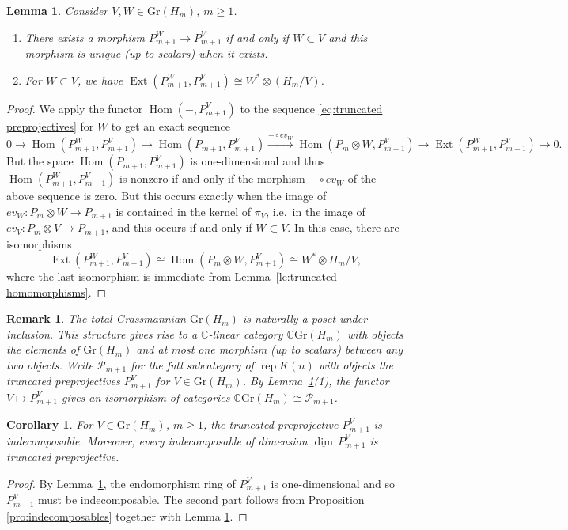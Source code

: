\documentclass{amsart}
\newtheorem{corollary}[theorem]{Corollary}
\newtheorem{lemma}[theorem]{Lemma}
\newtheorem{remark}[theorem]{Remark}
\numberwithin{equation}{section}
\newcommand{\cP}{\mathcal{P}}
\newcommand\udim{{\underline{\dim}\, }}
\newcommand{\rep}{\operatorname{rep}}
\newcommand{\Gr}{\mathrm{Gr}}
\newcommand{\CC}{\mathbb{C}}
\newcommand{\Ext}{\operatorname{Ext}}
\newcommand{\Hom}{\operatorname{Hom}}
\begin{document}
\begin{lemma}
  \label{le:unique morphisms}
  Consider $V,W\in \Gr(H_m)$, $m\ge1$.
  \begin{enumerate}
    \item There exists a morphism $P_{m+1}^W\to P_{m+1}^V$ if and only if $W\subset V$ and this morphism is unique (up to scalars) when it exists.
    \item For $W\subset V$, we have $\Ext(P_{m+1}^W,P_{m+1}^V)\cong W^*\otimes(H_m/V)$.
  \end{enumerate}
\end{lemma}
\begin{proof}
  We apply the functor $\Hom(-,P_{m+1}^V)$ to the sequence \eqref{eq:truncated preprojectives} for $W$ to get an exact sequence
  \[0\longrightarrow \Hom(P_{m+1}^W,P_{m+1}^V)\longrightarrow \Hom(P_{m+1},P_{m+1}^V)\stackrel{-\circ ev_W}{\longrightarrow} \Hom(P_m\otimes W,P_{m+1}^V)\longrightarrow \Ext(P_{m+1}^W,P_{m+1}^V)\longrightarrow 0.\]
  But the space $\Hom(P_{m+1},P_{m+1}^V)$ is one-dimensional and thus $\Hom(P_{m+1}^W,P_{m+1}^V)$ is nonzero if and only if the morphism $-\circ ev_W$ of the above sequence is zero.
  But this occurs exactly when the image of $ev_W:P_m\otimes W\to P_{m+1}$ is contained in the kernel of $\pi_V$, i.e.\ in the image of $ev_V:P_m\otimes V\to P_{m+1}$, and this occurs if and only if $W\subset V$. 
  In this case, there are isomorphisms
  \[\Ext(P_{m+1}^W,P_{m+1}^V)\cong\Hom(P_m\otimes W,P_{m+1}^V)\cong W^*\otimes H_m/V,\]
  where the last isomorphism is immediate from Lemma~\ref{le:truncated homomorphisms}.
\end{proof}

\begin{remark}
  The total Grassmannian $\Gr(H_m)$ is naturally a poset under inclusion.
  This structure gives rise to a $\CC$-linear category $\CC \Gr(H_m)$ with objects the elements of $\Gr(H_m)$ and at most one morphism (up to scalars) between any two objects.
  Write $\cP_{m+1}$ for the full subcategory of $\rep K(n)$ with objects the truncated preprojectives $P_{m+1}^V$ for $V\in \Gr(H_m)$.
  By Lemma~\ref{le:unique morphisms}(1), the functor $V\mapsto P_{m+1}^V$ gives an isomorphism of categories $\CC \Gr(H_m)\cong\cP_{m+1}$.
\end{remark}

\begin{corollary}
  \label{cor:indecomposable truncated} 
  For $V\in \Gr(H_m)$, $m\ge1$, the truncated preprojective $P_{m+1}^V$ is indecomposable.
  Moreover, every indecomposable of dimension $\udim P_{m+1}^V$ is truncated preprojective.
\end{corollary}
\begin{proof}
  By Lemma~\ref{le:unique morphisms}, the endomorphism ring of $P_{m+1}^V$ is one-dimensional and so $P_{m+1}^V$ must be indecomposable.
  The second part follows from Proposition \ref{pro:indecomposables} together with Lemma \ref{le:unique morphisms}.
\end{proof}
\end{document}
